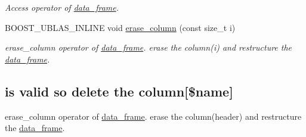 \begin{DoxyCompactItemize}
\begin{DoxyCompactList}\small\item\em Access operator of \hyperlink{classboost_1_1numeric_1_1ublas_1_1data__frame}{data\+\_\+frame}. \end{DoxyCompactList}\item 
B\+O\+O\+S\+T\+\_\+\+U\+B\+L\+A\+S\+\_\+\+I\+N\+L\+I\+NE void \hyperlink{classboost_1_1numeric_1_1ublas_1_1data__frame_a751e376399080f1c09ddf8ad1e11e478}{erase\+\_\+column} (const size\+\_\+t i)
\begin{DoxyCompactList}\small\item\em erase\+\_\+column operator of \hyperlink{classboost_1_1numeric_1_1ublas_1_1data__frame}{data\+\_\+frame}. erase the column({\ttfamily i}) and restructure the \hyperlink{classboost_1_1numeric_1_1ublas_1_1data__frame}{data\+\_\+frame}. \end{DoxyCompactList}\end{DoxyCompactItemize}
\subsection*{is valid so delete the column\mbox{[}\$name\mbox{]}}
\label{_amgrpc6b17b382216a655e548a62040c929a3}%
erase\+\_\+column operator of \hyperlink{classboost_1_1numeric_1_1ublas_1_1data__frame}{data\+\_\+frame}. erase the column({\ttfamily header}) and restructure the \hyperlink{classboost_1_1numeric_1_1ublas_1_1data__frame}{data\+\_\+frame}.


